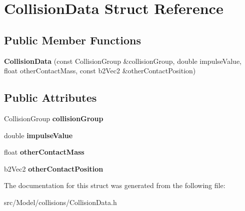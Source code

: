 \hypertarget{structCollisionData}{}\section{Collision\+Data Struct Reference}
\label{structCollisionData}
\subsection*{Public Member Functions}
\begin{DoxyCompactItemize}
\item 
{\bfseries Collision\+Data} (const Collision\+Group \&collision\+Group, double impulse\+Value, float other\+Contact\+Mass, const b2\+Vec2 \&other\+Contact\+Position)\hypertarget{structCollisionData_a2501b99e889257aa77552a408b8e4bee}{}\label{structCollisionData_a2501b99e889257aa77552a408b8e4bee}

\end{DoxyCompactItemize}
\subsection*{Public Attributes}
\begin{DoxyCompactItemize}
\item 
Collision\+Group {\bfseries collision\+Group}\hypertarget{structCollisionData_a49804c0a69aa20483f6506c326837472}{}\label{structCollisionData_a49804c0a69aa20483f6506c326837472}

\item 
double {\bfseries impulse\+Value}\hypertarget{structCollisionData_adeb5b92a90ea55f87afa2df1263354cd}{}\label{structCollisionData_adeb5b92a90ea55f87afa2df1263354cd}

\item 
float {\bfseries other\+Contact\+Mass}\hypertarget{structCollisionData_a02a069e4f45cd7b011b7ea8446e96983}{}\label{structCollisionData_a02a069e4f45cd7b011b7ea8446e96983}

\item 
b2\+Vec2 {\bfseries other\+Contact\+Position}\hypertarget{structCollisionData_aada0f93ddc5b0fe41df272157133363f}{}\label{structCollisionData_aada0f93ddc5b0fe41df272157133363f}

\end{DoxyCompactItemize}


The documentation for this struct was generated from the following file\+:\begin{DoxyCompactItemize}
\item 
src/\+Model/collisions/Collision\+Data.\+h\end{DoxyCompactItemize}
